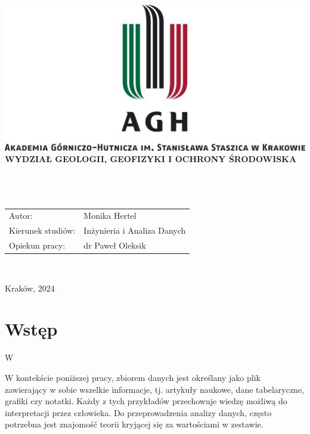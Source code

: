 \documentclass[12pt,a4paper,twoside]{article}
\begin{document}
\thispagestyle{empty}
\begin{center}
\includegraphics[width=\textwidth]{img/logo_AGH.jpg}\\
{\bf{\sf WYDZIAŁ GEOLOGII, GEOFIZYKI I OCHRONY ŚRODOWISKA}}\\[5mm]
{\bf{}}\\[14mm]

{}\\[12mm] 
{}\\[40mm]
\end{center}
{\sf\begin{tabular}{ll}
	Autor: & Monika Hertel\\
	Kierunek studiów: & Inżynieria i Analiza Danych\\
	Opiekun pracy: & dr Paweł Oleksik\\
\end{tabular}}\\[10mm]
\begin{center}
{\sf Kraków, 2024}
\end{center}
\newpage
\tableofcontents
\newpage
\section*{Wstęp}
W  \par
W kontekście poniższej pracy, zbiorem danych jest określany jako plik zawierający w sobie wszelkie informacje, tj. artykuły naukowe, dane tabelaryczne, grafiki czy notatki. Każdy z tych przykładów przechowuje wiedzę możliwą do interpretacji przez człowieka. Do przeprowadzenia analizy danych, często potrzebna jest znajomość teorii kryjącej się za wartościami w zestawie.
\end{document}
